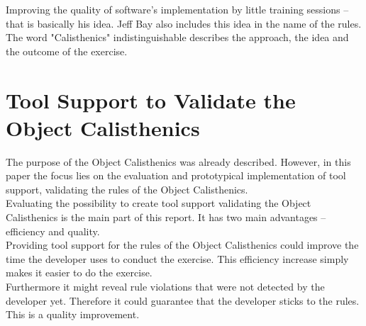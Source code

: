 Improving the quality of software's implementation by little training sessions -- that is basically his idea. Jeff Bay also includes this idea in the name of the rules. The word "Calisthenics" indistinguishable describes the approach, the idea and the outcome of the exercise.\\



\section{Tool Support to Validate the Object Calisthenics}



The purpose of the Object Calisthenics was already described. However, in this paper the focus lies on the evaluation and prototypical implementation of tool support, validating the rules of the Object Calisthenics. \\

Evaluating the possibility to create tool support validating the Object Calisthenics is the main part of this report. It has two main advantages -- efficiency and quality.\\

Providing tool support for the rules of the Object Calisthenics could improve the time the developer uses to conduct the exercise. This efficiency increase simply makes it easier to do the exercise.\\

Furthermore it might reveal rule violations that were not detected by the developer yet. Therefore it could guarantee that the developer sticks to the rules. This is a quality improvement. \\

